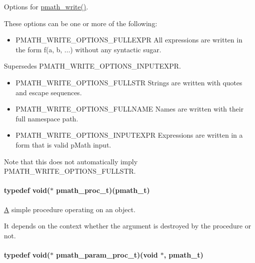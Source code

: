 Options for \hyperlink{group__objects_g9f909b9eb04317260ee8630d10e5a7c6}{pmath\_\-write()}. 

These options can be one or more of the following:\begin{itemize}
\item PMATH\_\-WRITE\_\-OPTIONS\_\-FULLEXPR All expressions are written in the form f(a, b, ...) without any syntactic sugar.\end{itemize}


Supersedes PMATH\_\-WRITE\_\-OPTIONS\_\-INPUTEXPR.

\begin{itemize}
\item PMATH\_\-WRITE\_\-OPTIONS\_\-FULLSTR Strings are written with quotes and escape sequences.\end{itemize}


\begin{itemize}
\item PMATH\_\-WRITE\_\-OPTIONS\_\-FULLNAME Names are written with their full namespace path.\end{itemize}


\begin{itemize}
\item PMATH\_\-WRITE\_\-OPTIONS\_\-INPUTEXPR Expressions are written in a form that is valid pMath input.\end{itemize}


Note that this does not automatically imply PMATH\_\-WRITE\_\-OPTIONS\_\-FULLSTR. \hypertarget{group__objects_g6c56c2d026f4cc8603a217291a8a35fb}{
\paragraph[{pmath\_\-proc\_\-t}]{\setlength{\rightskip}{0pt plus 5cm}typedef void($\ast$ {\bf pmath\_\-proc\_\-t})({\bf pmath\_\-t})}\hfill}
\label{group__objects_g6c56c2d026f4cc8603a217291a8a35fb}


\hyperlink{class_a}{A} simple procedure operating on an object. 

It depends on the context whether the argument is destroyed by the procedure or not. \hypertarget{group__objects_g3ae604b25e05979c1e7ff48524636b3e}{
\paragraph[{pmath\_\-param\_\-proc\_\-t}]{\setlength{\rightskip}{0pt plus 5cm}typedef void($\ast$ {\bf pmath\_\-param\_\-proc\_\-t})(void $\ast$, {\bf pmath\_\-t})}\hfill}
\label{group__objects_g3ae604b25e05979c1e7ff48524636b3e}



